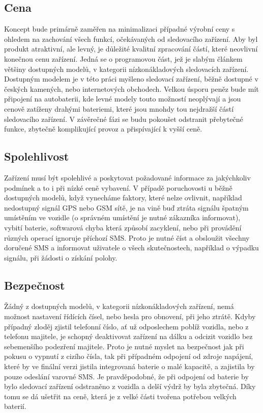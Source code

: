 \documentclass[FM,BP]{tulthesis}  %
\begin{document}
\subsection{Cena}
Koncept bude primárně zaměřen na minimalizaci případné výrobní ceny s ohledem na zachování všech funkcí, očekávaných od sledovacího zařízení. Aby byl produkt atraktivní, ale levný, je důležité kvalitní zpracování částí, které neovlivní konečnou cenu zařízení. Jedná se o programovou část, jež je slabým článkem většiny dostupných modelů, v kategorii nízkonákladových sledovacích zařízení. Dostupným modelem je v této práci myšleno sledovací zařízení, běžně dostupné v českých kamených, nebo internetových obchodech. Velkou úsporu peněz bude mít připojení na autobaterii, kde levné modely touto možností neoplývají a jsou cenově zatíženy drahými bateriemi, které jsou mnohdy tou nejdražší částí sledovacího zařízení. V závěrečné fázi se budu pokoušet odstranit přebytečné funkce, zbytečně komplikující provoz a přispívající k vyšší ceně.

\subsection{Spolehlivost}
Zařízení musí být spolehlivé a poskytovat požadované informace za jakýchkoliv podmínek a to i při nízké ceně vybavení. V případě poruchovosti u běžně dostupných modelů, když vynecháme faktory, které nelze ovlivnit, například nedostupný signál GPS nebo GSM sítě, je na vině buď ztráta signálu špatným umístěním ve vozidle (o správném umístění je nutné zákazníka informovat), vybití baterie, softwarová chyba která způsobí zacyklení, nebo při provádění různých operací ignoruje příchozí SMS. Proto je nutné číst a obsloužit všechny doručené SMS a informovat uživatele o všech skutečnostech, například o výpadku signálu, při žádosti o získání polohy.

\subsection{Bezpečnost}
Žádný z dostupných modelů, v kategorii nízkonákladových zařízení, nemá možnost nastavení řídících čísel, nebo hesla pro obnovení, při jeho ztrátě. Kdyby případný zloděj zjistil telefonní číslo, ať už odposlechem poblíž vozidla, nebo z telefonu majitele, je schopný deaktivovat zařízení na dálku a odcizit vozidlo bez sebemenšího podezření majitele. Proto je nutné myslet na bezpečnost jak při pokusu o vypnutí z cizího čísla, tak při případném odpojení od zdroje napájení, které by ve finální verzi jistila integrovaná baterie o malé kapacitě, a zajistila by pouze odeslání varovné SMS. Je pravděpodobné, že při odpojení od baterie by bylo sledovací zařízení odstraněno z vozidla a delší výdrž by byla zbytečná. Díky tomu se dá ušetřit na ceně, která je z velké části tvořena potřebou velkých baterií.
\end{document}
